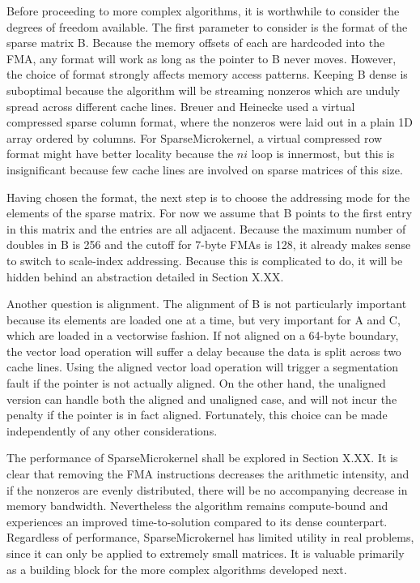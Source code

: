 Before proceeding to more complex algorithms, it is worthwhile to consider the degrees of freedom available. The first parameter to consider is the format of the sparse matrix B. Because the memory offsets of each  are hardcoded into the FMA, any format will work as long as the pointer to B never moves. However, the choice of format strongly affects memory access patterns. Keeping B dense is suboptimal because the algorithm will be streaming nonzeros which are unduly spread across different cache lines. Breuer and Heinecke used a virtual compressed sparse column format, where the nonzeros were laid out in a plain 1D array ordered by columns. For SparseMicrokernel, a virtual compressed row format might have better locality because the $ni$ loop is innermost, but this is insignificant because few cache lines are involved on sparse matrices of this size. 

Having chosen the format, the next step is to choose the addressing mode for the elements of the sparse matrix. For now we assume that B points to the first entry in this matrix and the entries are all adjacent. Because the maximum number of doubles in B is 256 and the cutoff for 7-byte FMAs is 128, it already makes sense to switch to scale-index addressing. Because this is complicated to do, it will be hidden behind an abstraction detailed in Section X.XX.

Another question is alignment. The alignment of B is not particularly important because its elements are loaded one at a time, but very important for A and C, which are loaded in a vectorwise fashion. If not aligned on a 64-byte boundary, the vector load operation will suffer a delay because the data is split across two cache lines. Using the aligned vector load operation  will trigger a segmentation fault if the pointer is not actually aligned. On the other hand, the unaligned version  can handle both the aligned and unaligned case, and will not incur the penalty if the pointer is in fact aligned. Fortunately, this choice can be made independently of any other considerations.

The performance of SparseMicrokernel shall be explored in Section X.XX. It is clear that removing the FMA instructions decreases the arithmetic intensity, and if the nonzeros are evenly distributed, there will be no accompanying decrease in memory bandwidth. Nevertheless the algorithm remains compute-bound and experiences an improved time-to-solution compared to its dense counterpart. Regardless of performance, SparseMicrokernel has limited utility in real problems, since it can only be applied to extremely small matrices. It is valuable primarily as a building block for the more complex algorithms developed next.


